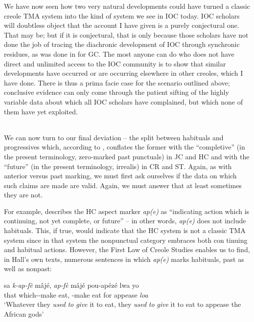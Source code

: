We have now seen how two very natural developments could have turned a classic creole TMA system into the kind of system we see in IOC today. IOC scholars will doubtless object that the account I have given is a purely conjectural one. That may be; but if it is con\-jectural, that is only because those scholars have not done the job of tracing the diachronic development of IOC through synchronic resi\-dues, as was done in \citet{Bickerton1975} for GC. The most anyone can do who does not have direct and unlimited access to the IOC commun\-ity is to show that similar developments have occurred or are occurring elsewhere in other creoles, which I have done. There is thus a prima facie case for the scenario outlined above; conclusive evidence can only come through the patient sifting of the highly variable data about which all IOC scholars have complained, but which none of them have yet exploited.\\\\

We can now turn to our final deviation -- the split between habi\-tuals and progressives which, according to \citet{Taylor1971}, conflates the former with the ``completive'' (in the present terminology, zero-marked past punctuals) in JC and HC and with the ``future'' (in the present terminology, irrealis) in CR and ST. Again, as with anterior versus past marking, we must first ask ourselves if the data on which such claims are made are valid. Again, we must answer that at least sometimes they are not.

For example, \citet[31]{Hall1953} describes the HC aspect marker \textit{ap(e)} as ``indicating action which is continuing, not yet complete, or future'' -- in other words, \textit{ap(e)} does not include habituals. This, if true, would indicate that the HC system is not a classic TMA system since in that system the nonpunctual category embraces both con%
tinuing and habitual actions. However, the First Law of Creole Studies enables us to find, in Hall's own texts, numerous sentences in which \textit{ap(e)} marks habituals, past as well as nonpast:

\ea\label{ex:2:122}
\gll sa \emph{k-ap-fè} mâjé, \emph{ap-fè} mâjé pou-apézé lwa yo\\
that which-\ASP-make eat, \ASP-make eat {for appease} \textit{loa} {\PL}\\
\glt `Whatever they \textit{used} \textit{to} \textit{give} it to eat, they \textit{used} \textit{to} \textit{give} it to eat to appease the African gods'
\z

